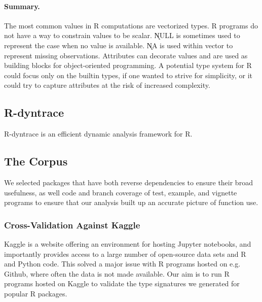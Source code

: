 \documentclass[acmsmall,review,anonymous]{acmart}\settopmatter{printfolios=true,printccs=false,printacmref=false}
\begin{document}
\paragraph{Summary.} The most common values in R computations are vectorized
types. R programs do not have a way to constrain values to be scalar.
\k{NULL} is sometimes used to represent the case when no value is
available. \k{NA} is used within vector to represent missing observations.
Attributes can decorate values and are used as building blocks for
object-oriented programming. A potential type system for R could focus only
on the builtin types, if one wanted to strive for simplicity, or it could
try to capture attributes at the risk of increased complexity.

%
%
%
%
\subsection{R-dyntrace}
\label{sec:r-dyntrace}


R-dyntrace is an efficient dynamic analysis framework for R.

%
%
%
%
\subsection{The Corpus}


We selected packages that have both  reverse dependencies to ensure their broad usefulness, as well  code and branch coverage of test, example, and vignette programs to ensure that our analysis built up an accurate picture of function use.

%
%
\subsubsection{Cross-Validation Against Kaggle}

Kaggle is a website offering an environment for hosting Jupyter notebooks, and importantly provides access to a large number of open-source data sets and R and Python code.
This solved a major issue with R programs hosted on e.g. Github, where often the data is not made available.
Our aim is to run R programs hosted on Kaggle to validate the type signatures we generated for popular R packages.
\end{document}

